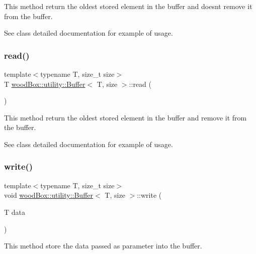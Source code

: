 This method return the oldest stored element in the buffer and doesn\textquotesingle{}t remove it from the buffer.

See class detailed documentation for example of usage. \mbox{\label{classwood_box_1_1utility_1_1_buffer_a8832f6e544e23f738ee50216d805572d}} 
\subsubsection{\texorpdfstring{read()}{read()}}
{\footnotesize\ttfamily template$<$typename T, size\+\_\+t size$>$ \\
T \mbox{\hyperlink{classwood_box_1_1utility_1_1_buffer}{wood\+Box\+::utility\+::\+Buffer}}$<$ T, size $>$\+::read (\begin{DoxyParamCaption}{ }\end{DoxyParamCaption})\hspace{0.3cm}{\ttfamily [inline]}}

This method return the oldest stored element in the buffer and remove it from the buffer.

See class detailed documentation for example of usage. \mbox{\label{classwood_box_1_1utility_1_1_buffer_a2d7857dc93d7e229941ca36a018587e9}} 
\subsubsection{\texorpdfstring{write()}{write()}}
{\footnotesize\ttfamily template$<$typename T, size\+\_\+t size$>$ \\
void \mbox{\hyperlink{classwood_box_1_1utility_1_1_buffer}{wood\+Box\+::utility\+::\+Buffer}}$<$ T, size $>$\+::write (\begin{DoxyParamCaption}\item[{T}]{data }\end{DoxyParamCaption})\hspace{0.3cm}{\ttfamily [inline]}}

This method store the data passed as parameter into the buffer.

